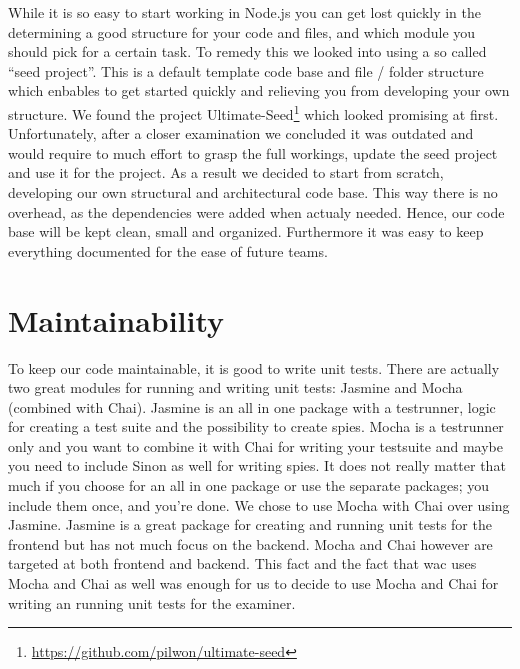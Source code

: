 While it is so easy to start working in Node.js
you can get lost quickly in the determining a good structure
for your code and files,
and which module you should pick for a certain task.
To remedy this we looked into using a so called ``seed project''.
This is a default template code base and file / folder structure which enbables
to get started quickly and relieving you from developing your own structure.
We found the project
Ultimate-Seed\footnote{\url{https://github.com/pilwon/ultimate-seed}}
which looked promising at first.
Unfortunately, after a closer examination we concluded it was outdated
and would require to much effort to grasp the full workings,
update the seed project and use it for the \gls{project}.
As a result we decided to start from scratch,
developing our own structural and architectural code base.
This way there is no overhead, as the dependencies were added when actualy 
needed. Hence, our code base will be kept clean, small and organized.
Furthermore it was easy to keep everything documented for the ease of future 
teams.

\section{Maintainability}
To keep our code maintainable, it is good to write unit tests.
There are actually two great modules for running and writing unit tests:
Jasmine and Mocha (combined with Chai).
Jasmine is an all in one package with a testrunner,
logic for creating a test suite and the possibility to create spies.
Mocha is a testrunner only
and you want to combine it with Chai for writing your testsuite
and maybe you need to include Sinon as well for writing spies.
It does not really matter that much if you choose for an all in one package
or use the separate packages; you include them once, and you're done.
We chose to use Mocha with Chai over using Jasmine.
Jasmine is a great package for creating and running unit tests for the frontend
but has not much focus on the backend.
Mocha and Chai however are targeted at both frontend and backend.
This fact and the fact that \gls{wac} uses Mocha and Chai as well
was enough for us to decide to use Mocha and Chai
for writing an running unit tests for the \gls{examiner}.
